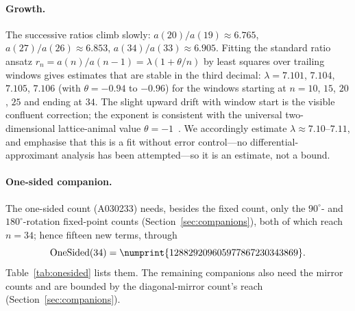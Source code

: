 \documentclass[11pt]{article}
\newcommand{\num}[1]{\numprint{#1}}
\begin{document}
\paragraph{Growth.}
The successive ratios climb slowly: $a(20)/a(19)\approx6.765$,
$a(27)/a(26)\approx6.853$, $a(34)/a(33)\approx6.905$. Fitting the standard
ratio ansatz $r_n=a(n)/a(n{-}1)=\lambda(1+\theta/n)$ by least squares over
trailing windows gives estimates that are stable in the third decimal:
$\lambda=7.101$, $7.104$, $7.105$, $7.106$ (with $\theta=-0.94$ to $-0.96$)
for the windows starting at $n=10$, $15$, $20$, $25$ and ending at $34$. The
slight upward drift with window start is the visible confluent correction;
the exponent is consistent with the universal two-dimensional lattice-animal
value $\theta=-1$~\cite{jensen2001}. We accordingly estimate
$\lambda\approx7.10$--$7.11$, and emphasise that this is a fit without error
control---no differential-approximant analysis has been attempted---so it is
an estimate, not a bound.

\paragraph{One-sided companion.}
The one-sided count (A030233) needs, besides the fixed count, only the
$90^\circ$- and $180^\circ$-rotation fixed-point counts
(Section~\ref{sec:companions}), both of which reach $n=34$; hence fifteen new
terms, through
\[
  \mathrm{OneSided}(34)=\num{128829209605977867230343869}.
\]
Table~\ref{tab:onesided} lists them. The remaining companions also need the
mirror counts and are bounded by the diagonal-mirror count's reach
(Section~\ref{sec:companions}).
\end{document}
